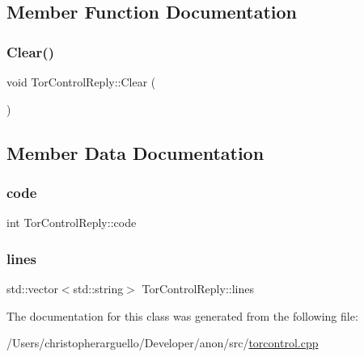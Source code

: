 \subsection{Member Function Documentation}
\mbox{\label{class_tor_control_reply_a94cbd96ffa94322e84ea47daa8ca62bb}} 
\subsubsection{\texorpdfstring{Clear()}{Clear()}}
{\footnotesize\ttfamily void Tor\+Control\+Reply\+::\+Clear (\begin{DoxyParamCaption}{ }\end{DoxyParamCaption})\hspace{0.3cm}{\ttfamily [inline]}}



\subsection{Member Data Documentation}
\mbox{\label{class_tor_control_reply_aba46f4c0571808c99097edd3246c2f6a}} 
\subsubsection{\texorpdfstring{code}{code}}
{\footnotesize\ttfamily int Tor\+Control\+Reply\+::code}

\mbox{\label{class_tor_control_reply_ae9c09a2c2d674c1554c91ace852e5269}} 
\subsubsection{\texorpdfstring{lines}{lines}}
{\footnotesize\ttfamily std\+::vector$<$std\+::string$>$ Tor\+Control\+Reply\+::lines}



The documentation for this class was generated from the following file\+:\begin{DoxyCompactItemize}
\item 
/\+Users/christopherarguello/\+Developer/anon/src/\mbox{\hyperlink{torcontrol_8cpp}{torcontrol.\+cpp}}\end{DoxyCompactItemize}
